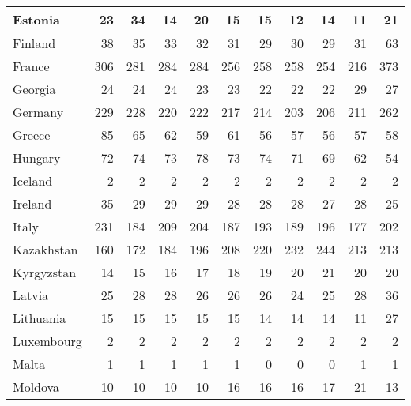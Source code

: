 \begin{table}
\begin{tabular}{|l|r|r|r|r|r|r|r|r|r|r|}
                       Estonia&     23&     34&     14&     20&     15&     15&     12&     14&     11&     21\\\hline
                       Finland&     38&     35&     33&     32&     31&     29&     30&     29&     31&     63\\\hline
                        France&    306&    281&    284&    284&    256&    258&    258&    254&    216&    373\\\hline
                       Georgia&     24&     24&     24&     23&     23&     22&     22&     22&     29&     27\\\hline
                       Germany&    229&    228&    220&    222&    217&    214&    203&    206&    211&    262\\\hline
                        Greece&     85&     65&     62&     59&     61&     56&     57&     56&     57&     58\\\hline
                       Hungary&     72&     74&     73&     78&     73&     74&     71&     69&     62&     54\\\hline
                       Iceland&      2&      2&      2&      2&      2&      2&      2&      2&      2&      2\\\hline
                       Ireland&     35&     29&     29&     29&     28&     28&     28&     27&     28&     25\\\hline
                         Italy&    231&    184&    209&    204&    187&    193&    189&    196&    177&    202\\\hline
                    Kazakhstan&    160&    172&    184&    196&    208&    220&    232&    244&    213&    213\\\hline
                    Kyrgyzstan&     14&     15&     16&     17&     18&     19&     20&     21&     20&     20\\\hline
                        Latvia&     25&     28&     28&     26&     26&     26&     24&     25&     28&     36\\\hline
                     Lithuania&     15&     15&     15&     15&     15&     14&     14&     14&     11&     27\\\hline
                    Luxembourg&      2&      2&      2&      2&      2&      2&      2&      2&      2&      2\\\hline
                         Malta&      1&      1&      1&      1&      1&      0&      0&      0&      1&      1\\\hline
                       Moldova&     10&     10&     10&     10&     16&     16&     16&     17&     21&     13\\\hline

\end{tabular}
\end{table}
